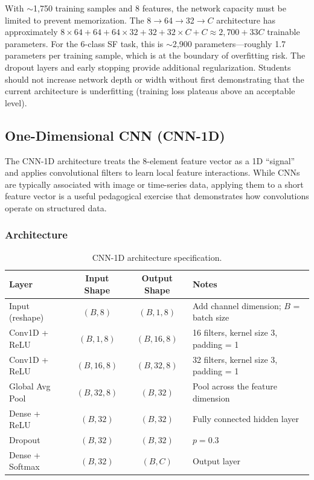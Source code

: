 \documentclass[11pt,letterpaper]{article}
\begin{document}
	\begin{tcolorbox}[infobox={Design Principle: Why Not a Larger Network?}]
		With $\sim$1{,}750 training samples and 8 features, the network capacity must be limited to prevent memorization. The 8$\rightarrow$64$\rightarrow$32$\rightarrow C$ architecture has approximately $8 \times 64 + 64 + 64 \times 32 + 32 + 32 \times C + C \approx 2{,}700 + 33C$ trainable parameters. For the 6-class SF task, this is $\sim$2{,}900 parameters---roughly 1.7 parameters per training sample, which is at the boundary of overfitting risk. The dropout layers and early stopping provide additional regularization. Students should not increase network depth or width without first demonstrating that the current architecture is underfitting (training loss plateaus above an acceptable level).
	\end{tcolorbox}

	\subsection{One-Dimensional CNN (CNN-1D)}

	The CNN-1D architecture treats the 8-element feature vector as a 1D ``signal'' and applies convolutional filters to learn local feature interactions. While CNNs are typically associated with image or time-series data, applying them to a short feature vector is a useful pedagogical exercise that demonstrates how convolutions operate on structured data.

	\subsubsection{Architecture}

	\begin{table}[ht!]
		\centering
		\caption{CNN-1D architecture specification.}
		\label{tab:cnn_arch}
		\renewcommand{\arraystretch}{1.3}
		\begin{tabularx}{\textwidth}{l c c X}
			\toprule
			\textbf{Layer} & \textbf{Input Shape} & \textbf{Output Shape} & \textbf{Notes} \\
			\midrule
			Input (reshape) & $(B, 8)$ & $(B, 1, 8)$ & Add channel dimension; $B$ = batch size \\
			Conv1D + ReLU & $(B, 1, 8)$ & $(B, 16, 8)$ & 16 filters, kernel size 3, padding = 1 \\
			Conv1D + ReLU & $(B, 16, 8)$ & $(B, 32, 8)$ & 32 filters, kernel size 3, padding = 1 \\
			Global Avg Pool & $(B, 32, 8)$ & $(B, 32)$ & Pool across the feature dimension \\
			Dense + ReLU & $(B, 32)$ & $(B, 32)$ & Fully connected hidden layer \\
			Dropout & $(B, 32)$ & $(B, 32)$ & $p = 0.3$ \\
			Dense + Softmax & $(B, 32)$ & $(B, C)$ & Output layer \\
			\bottomrule
		\end{tabularx}
	\end{table}
\end{document}

